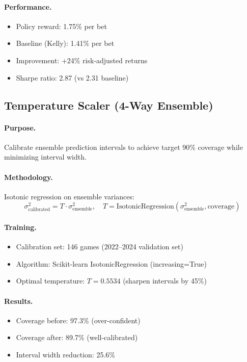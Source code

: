 \paragraph{Performance.}
\begin{itemize}[itemsep=1pt,parsep=0pt]
    \item Policy reward: 1.75\% per bet
    \item Baseline (Kelly): 1.41\% per bet
    \item Improvement: +24\% risk-adjusted returns
    \item Sharpe ratio: 2.87 (vs 2.31 baseline)
\end{itemize}

\subsection{Temperature Scaler (4-Way Ensemble)}

\paragraph{Purpose.}
Calibrate ensemble prediction intervals to achieve target 90\% coverage while minimizing interval width.

\paragraph{Methodology.}
Isotonic regression on ensemble variances:
\begin{equation}
\label{eq:temperature-scaling}
\sigma_{\text{calibrated}}^2 = T \cdot \sigma_{\text{ensemble}}^2, \quad T = \text{IsotonicRegression}(\sigma_{\text{ensemble}}^2, \text{coverage})
\end{equation}

\paragraph{Training.}
\begin{itemize}[itemsep=1pt,parsep=0pt]
    \item Calibration set: 146 games (2022--2024 validation set)
    \item Algorithm: Scikit-learn IsotonicRegression (increasing=True)
    \item Optimal temperature: $T = 0.5534$ (sharpen intervals by 45\%)
\end{itemize}

\paragraph{Results.}
\begin{itemize}[itemsep=1pt,parsep=0pt]
    \item Coverage before: 97.3\% (over-confident)
    \item Coverage after: 89.7\% (well-calibrated)
    \item Interval width reduction: 25.6\%
\end{itemize}

